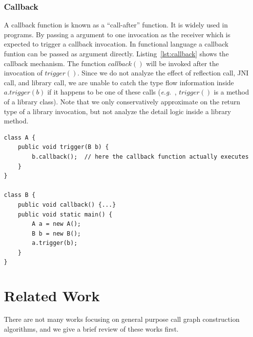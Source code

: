 \documentclass{fac}
\newcommand\eg{\textit{e.g.\ }}
\begin{document}
\subsubsection{Callback}\label{subsubsec:callback}
A callback function is known as a ``call-after'' function. It is widely used in programs. By passing a argument to one invocation as the receiver which is expected to trigger a callback invocation. In functional language a callback funtion can be passed as argument directly. Listing~\ref{lst:callback}
 shows the callback mechanism. The function $callback()$ will be invoked after the invocation of $trigger()$. Since we do not analyze the effect of reflection call, JNI call, and library call, we are unable to catch the type flow information inside $a.trigger(b)$ if it happens to be one of these calls (\eg, $trigger()$ is a method of a library class). Note that we only conservatively approximate on the return type of a library invocation, but not analyze the detail logic inside a library method.

\begin{minipage}{\linewidth}
\vspace{10pt}
\begin{lstlisting}[caption={Callback mechanism},label={lst:callback}]
class A {
	public void trigger(B b) {
		b.callback();  // here the callback function actually executes
	}
}

class B {
	public void callback() {...}
	public void static main() {
		A a = new A();
		B b = new B();
		a.trigger(b);
 	}
}
\end{lstlisting}
\end{minipage}

\section{Related Work}\label{sec:related-work}
There are not many works focusing on general purpose call graph construction algorithms, and we give a brief review of these works first.
\end{document}
